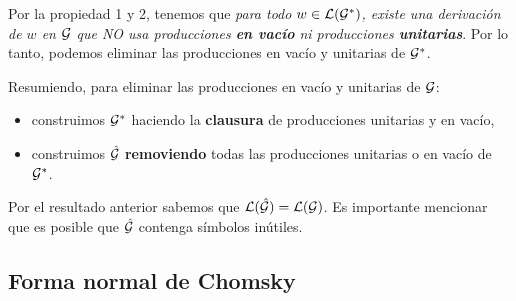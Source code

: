 Por la propiedad 1 y 2, tenemos que \textit{para todo $w \in \mathcal{L}(\mathcal{G}^*)$, existe una derivación de $w$ en $\mathcal{G}$ que NO usa producciones \textbf{en vacío} ni producciones \textbf{unitarias}}. Por lo tanto, podemos eliminar las producciones en vacío y unitarias de $\mathcal{G}^*$.


Resumiendo, para eliminar las producciones en vacío y unitarias de $\mathcal{G}$:
\begin{itemize}
    \item construimos $\mathcal{G}^*$ haciendo la \textbf{clausura} de producciones unitarias y en vacío,
    \item construimos $\hat{\mathcal{G}}$ \textbf{removiendo} todas las producciones unitarias o en vacío de $\mathcal{G}^*$.
\end{itemize}
Por el resultado anterior sabemos que $\mathcal{L}(\hat{\mathcal{G}}) = \mathcal{L}(\mathcal{G})$. Es importante mencionar que es posible que $\hat{\mathcal{G}}$ contenga símbolos inútiles.

\subsection{Forma normal de Chomsky}


